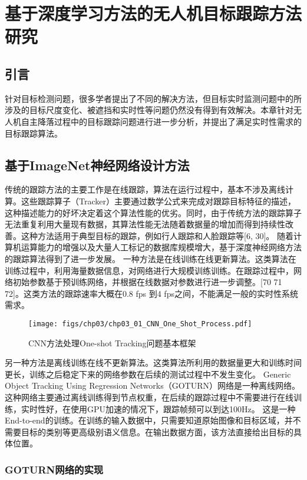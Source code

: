 \chapter{基于深度学习方法的无人机目标跟踪方法研究}
\label{chap:main}


\section{引言}
针对目标检测问题，很多学者提出了不同的解决方法，但目标实时监测问题中的所涉及的目标尺度变化、被遮挡和实时性等问题仍然没有得到有效解决。本章针对无人机自主降落过程中的目标跟踪问题进行进一步分析，并提出了满足实时性需求的目标跟踪算法。

\section{基于ImageNet神经网络设计方法}
传统的跟踪方法的主要工作是在线跟踪，算法在运行过程中，基本不涉及离线计算。这些跟踪算子（Tracker）主要通过数学公式来完成对跟踪目标特征的描述，这种描述能力的好坏决定着这个算法性能的优劣。同时，由于传统方法的跟踪算子无法重复利用大量现有数据，其算法性能无法随着数据量的增加而得到持续性改善。这种方法适用于典型目标的跟踪，例如行人跟踪和人脸跟踪等[6, 30]。
随着计算机运算能力的增强以及大量人工标记的数据库规模增大，基于深度神经网络方法的跟踪算法得到了进一步发展。
一种方法是在线训练在线更新算法。这类算法在训练过程中，利用海量数据信息，对网络进行大规模训练训练。在跟踪过程中，网络初始参数基于预训练网络，并根据在线数据对参数进行进一步调整。[70 71 72]。这类方法的跟踪速率大概在0.8 fps 到4 fps之间，不能满足一般的实时性系统需求。

\begin{figure}[htb]   
	\centering
	\texttt{[image: figs/chp03/chp03\_01\_CNN\_One\_Shot\_Process.pdf]}
	\caption{CNN方法处理One-shot Tracking问题基本框架}
	\label{fig:161002.chp03_01_CNN_One_Shot_Process}
\end{figure}

另一种方法是离线训练在线不更新算法。这类算法所利用的数据量更大和训练时间更长，训练之后稳定下来的网络参数在后续的测试过程中不发生变化。
Generic Object Tracking Using Regression Networks（GOTURN）网络是一种离线网络。这种网络主要通过离线训练得到节点权重，在后续的跟踪过程中不需要进行在线训练，实时性好，在使用GPU加速的情况下，跟踪帧频可以到达100Hz。
这是一种End-to-end的训练。在训练的输入数据中，只需要知道原始图像和目标区域，并不需要目标的类别等更高级别语义信息。在输出数据方面，该方法直接给出目标的具体位置。

\subsection{GOTURN网络的实现}



